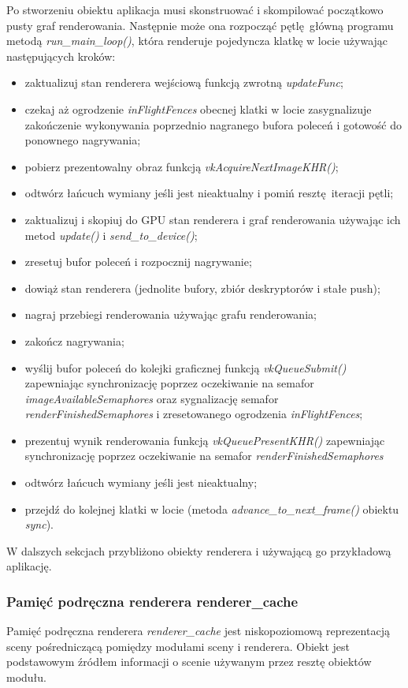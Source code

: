 Po stworzeniu obiektu aplikacja musi skonstruować i skompilować początkowo pusty graf renderowania.
Następnie może ona rozpocząć pętlę główną programu metodą \textit{run\_main\_loop()}, która renderuje pojedyncza klatkę w locie używając następujących kroków:
\begin{itemize}
	\item zaktualizuj stan renderera wejściową funkcją zwrotną \textit{updateFunc};
	\item czekaj aż ogrodzenie \textit{inFlightFences} obecnej klatki w locie zasygnalizuje zakończenie wykonywania poprzednio nagranego bufora poleceń i gotowość do ponownego nagrywania;
	\item pobierz prezentowalny obraz funkcją \textit{vkAcquireNextImageKHR()};
	\item odtwórz łańcuch wymiany jeśli jest nieaktualny i pomiń resztę iteracji pętli;
	\item zaktualizuj i skopiuj do GPU stan renderera i graf renderowania używając ich metod \textit{update()} i \textit{send\_to\_device()};
	\item zresetuj bufor poleceń i rozpocznij nagrywanie;
	\item dowiąż stan renderera (jednolite bufory, zbiór deskryptorów i stałe push);
	\item nagraj przebiegi renderowania używając grafu renderowania;
	\item zakończ nagrywania;
	\item wyślij bufor poleceń do kolejki graficznej funkcją \textit{vkQueueSubmit()} zapewniając synchronizację poprzez oczekiwanie na semafor \textit{imageAvailableSemaphores} oraz sygnalizację semafor \textit{renderFinishedSemaphores} i zresetowanego ogrodzenia \textit{inFlightFences};
	\item prezentuj wynik renderowania funkcją \textit{vkQueuePresentKHR()} zapewniając synchronizację poprzez oczekiwanie na semafor \textit{renderFinishedSemaphores}
	\item odtwórz łańcuch wymiany jeśli jest nieaktualny;
	\item przejdź do kolejnej klatki w locie (metoda \textit{advance\_to\_next\_frame()} obiektu \textit{sync}).
\end{itemize}

W dalszych sekcjach przybliżono obiekty renderera i używającą go przykładową aplikację.


\subsubsection{Pamięć podręczna renderera renderer\_cache}
Pamięć podręczna renderera \textit{renderer\_cache} jest niskopoziomową reprezentacją sceny pośredniczącą pomiędzy modułami sceny i renderera.
Obiekt jest podstawowym źródłem informacji o scenie używanym przez resztę obiektów modułu.

